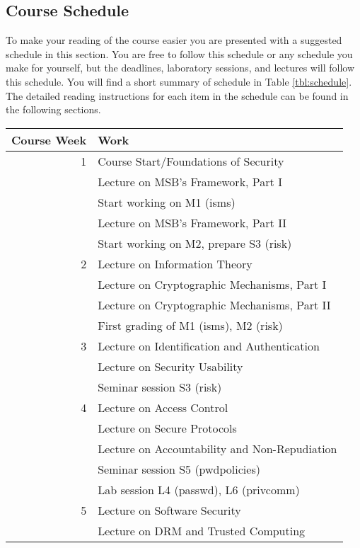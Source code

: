 \documentclass[a4paper,logo]{miunart}
\begin{document}
\subsection{Course Schedule}
\label{sec:schedule}
To make your reading of the course easier you are presented with a suggested 
schedule in this section.
You are free to follow this schedule or any schedule you make for yourself, but 
the deadlines, laboratory sessions, and lectures will follow this schedule.
You will find a short summary of schedule in Table \ref{tbl:schedule}.
The detailed reading instructions for each item in the schedule can be found in 
the following sections.

\begin{table}
	\centering
  \begin{tabular}{rp{9cm}}
    \textbf{Course Week}	& \textbf{Work} \\
    \toprule
    1
      & Course Start/Foundations of Security\\
      & Lecture on MSB's Framework, Part I\\
      & Start working on M1 (isms)\\
      & Lecture on MSB's Framework, Part II\\
      & Start working on M2, prepare S3 (risk)\\
    \midrule
    2
      & Lecture on Information Theory\\
      & Lecture on Cryptographic Mechanisms, Part I\\
      & Lecture on Cryptographic Mechanisms, Part II\\
      & First grading of M1 (isms), M2 (risk)\\
    \midrule
    3
      & Lecture on Identification and Authentication\\
      & Lecture on Security Usability\\
      & Seminar session S3 (risk)\\
    \midrule
    4
      & Lecture on Access Control\\
      & Lecture on Secure Protocols\\
      & Lecture on Accountability and Non-Repudiation\\
      & Seminar session S5 (pwdpolicies)\\
      & Lab session L4 (passwd), L6 (privcomm)\\
    \midrule
    5
      & Lecture on Software Security\\
      & Lecture on DRM and Trusted Computing\\

\end{tabular}
\end{table}
\end{document}
